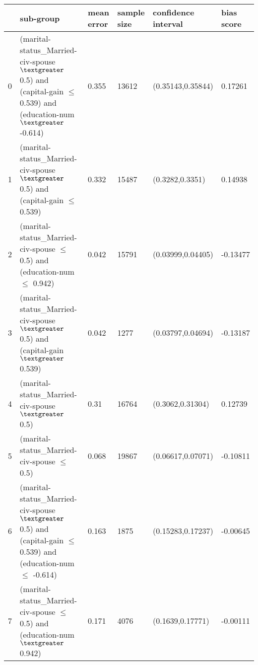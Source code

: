 \begin{tabular}{llllll}
\toprule
{} &                                                                                            sub-group & mean error & sample size & confidence interval & bias score \\
\midrule
0 &   (marital-status\_Married-civ-spouse $\textgreater$ 0.5) and (capital-gain $\leq$ 0.539) and (education-num $\textgreater$ -0.614) &      0.355 &       13612 &   (0.35143,0.35844) &    0.17261 \\
1 &                                (marital-status\_Married-civ-spouse $\textgreater$ 0.5) and (capital-gain $\leq$ 0.539) &      0.332 &       15487 &     (0.3282,0.3351) &    0.14938 \\
2 &                              (marital-status\_Married-civ-spouse $\leq$ 0.5) and (education-num $\leq$ 0.942) &      0.042 &       15791 &   (0.03999,0.04405) &   -0.13477 \\
3 &                                 (marital-status\_Married-civ-spouse $\textgreater$ 0.5) and (capital-gain $\textgreater$ 0.539) &      0.042 &        1277 &   (0.03797,0.04694) &   -0.13187 \\
4 &                                                            (marital-status\_Married-civ-spouse $\textgreater$ 0.5) &       0.31 &       16764 &    (0.3062,0.31304) &    0.12739 \\
5 &                                                           (marital-status\_Married-civ-spouse $\leq$ 0.5) &      0.068 &       19867 &   (0.06617,0.07071) &   -0.10811 \\
6 &  (marital-status\_Married-civ-spouse $\textgreater$ 0.5) and (capital-gain $\leq$ 0.539) and (education-num $\leq$ -0.614) &      0.163 &        1875 &   (0.15283,0.17237) &   -0.00645 \\
7 &                               (marital-status\_Married-civ-spouse $\leq$ 0.5) and (education-num $\textgreater$ 0.942) &      0.171 &        4076 &    (0.1639,0.17771) &   -0.00111 \\
\bottomrule
\end{tabular}
